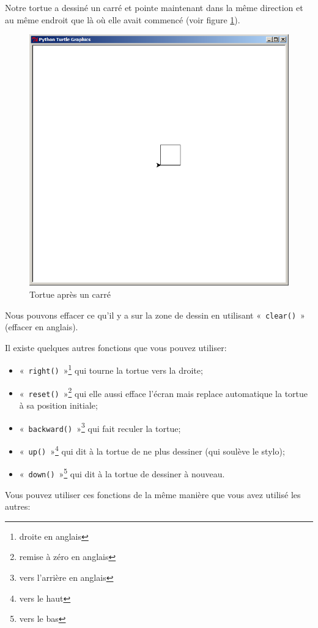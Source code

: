 Notre tortue a dessiné un carré et pointe maintenant dans la même direction et au même endroit que là où elle avait commencé (voir figure \ref{fig:tcar}).
\begin{figure}[!ht]
\centering
\includegraphics[scale=0.3]{images/tcar.png}
\caption{Tortue après un carré}
\label{fig:tcar}
\end{figure}

Nous pouvons effacer ce qu'il y a sur la zone de dessin en utilisant «~\texttt{clear()}~» (effacer en anglais).

Il  existe quelques autres fonctions que vous pouvez utiliser: 
\begin{itemize}
\item «~\texttt{right()}~»\footnote{droite en anglais} qui tourne la tortue vers la droite;
\item «~\texttt{reset()}~»\footnote{remise à zéro en anglais} qui elle aussi efface l'écran mais replace automatique la tortue à sa position initiale;
\item «~\texttt{backward()}~»\footnote{vers l'arrière en anglais} qui fait reculer la tortue;
\item «~\texttt{up()}~»\footnote{vers le haut} qui dit à la tortue de ne plus dessiner (qui soulève le stylo);
\item «~\texttt{down()}~»\footnote{vers le bas} qui dit à la tortue de dessiner à nouveau.
\end{itemize}
 Vous pouvez utiliser ces fonctions de la même manière que vous avez utilisé les autres:
 
